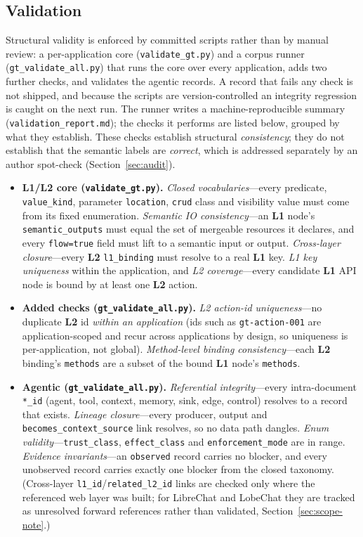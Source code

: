 \documentclass[11pt,a4paper]{article}
\newcommand{\cd}[1]{\lstinline[basicstyle=\ttfamily\small]|#1|}
\renewcommand{\L}[1]{\textbf{L#1}}
\begin{document}
\subsection{Validation}\label{sec:val}
Structural validity is enforced by committed scripts rather than by manual review: a
per-application core (\cd{validate_gt.py}) and a corpus runner (\cd{gt_validate_all.py}) that
runs the core over every application, adds two further checks, and validates the agentic
records. A record that fails any check is not shipped, and because the scripts are
version-controlled an integrity regression is caught on the next run. The runner writes a
machine-reproducible summary (\cd{validation_report.md}); the checks it performs are listed
below, grouped by what they establish. These checks establish structural
\emph{consistency}; they do not establish that the semantic labels are \emph{correct}, which
is addressed separately by an author spot-check (Section~\ref{sec:audit}).
\begin{itemize}[leftmargin=1.5em,itemsep=3pt]
\item \textbf{L1/L2 core (\cd{validate_gt.py}).}
      \emph{Closed vocabularies}---every predicate, \cd{value_kind}, parameter
      \cd{location}, \cd{crud} class and visibility value must come from its fixed
      enumeration.
      \emph{Semantic IO consistency}---an \L1 node's \cd{semantic_outputs} must equal the set
      of mergeable resources it declares, and every \cd{flow=true} field must lift to a
      semantic input or output.
      \emph{Cross-layer closure}---every \L2 \cd{l1_binding} must resolve to a real \L1 key.
      \emph{L1 key uniqueness} within the application, and \emph{L2 coverage}---every
      candidate \L1 API node is bound by at least one \L2 action.
\item \textbf{Added checks (\cd{gt_validate_all.py}).}
      \emph{L2 action-id uniqueness}---no duplicate \L2 id \emph{within an application}
      (ids such as \cd{gt-action-001} are application-scoped and recur across applications by
      design, so uniqueness is per-application, not global).
      \emph{Method-level binding consistency}---each \L2 binding's \cd{methods} are a subset
      of the bound \L1 node's \cd{methods}.
\item \textbf{Agentic (\cd{gt_validate_all.py}).}
      \emph{Referential integrity}---every intra-document \cd{*_id} (agent, tool, context,
      memory, sink, edge, control) resolves to a record that exists.
      \emph{Lineage closure}---every producer, output and \cd{becomes_context_source} link
      resolves, so no data path dangles.
      \emph{Enum validity}---\cd{trust_class}, \cd{effect_class} and \cd{enforcement_mode}
      are in range.
      \emph{Evidence invariants}---an \cd{observed} record carries no blocker, and every
      unobserved record carries exactly one blocker from the closed taxonomy. (Cross-layer
      \cd{l1_id}/\cd{related_l2_id} links are checked only where the referenced web layer was
      built; for LibreChat and LobeChat they are tracked as unresolved forward references
      rather than validated, Section~\ref{sec:scope-note}.)
\end{itemize}
\end{document}
